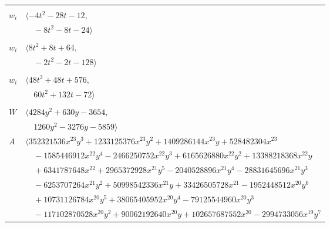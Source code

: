 \documentclass[11pt]{article}
\begin{document}
\begin{longtable}{@{}ll@{}}
\addlinespace[2pt]
\multicolumn{2}{@{}p{0.97\textwidth}@{}}{$i=7$, $D_i=4$, $\rho_{ij}$: $15{:}2, \allowbreak 21{:}1, \allowbreak 36{:}1, \allowbreak 42{:}1, \allowbreak 45{:}1, \allowbreak 56{:}2, \allowbreak 63{:}2, \allowbreak 64{:}1, \allowbreak 73{:}2$}\\
$w_i$ & $\langle -4t^{2}-28t-12,$\\
 & $\quad -8t^{2}-8t-24\rangle$\\
\addlinespace[2pt]
\multicolumn{2}{@{}p{0.97\textwidth}@{}}{$i=8$, $D_i=2$, $\rho_{ij}$: $1{:}2, \allowbreak 14{:}2, \allowbreak 32{:}2, \allowbreak 45{:}1, \allowbreak 50{:}2, \allowbreak 65{:}1$}\\
$w_i$ & $\langle 8t^{2}+8t+64,$\\
 & $\quad -2t^{2}-2t-128\rangle$\\
\addlinespace[2pt]
\multicolumn{2}{@{}p{0.97\textwidth}@{}}{$i=9$, $D_i=2$, $\rho_{ij}$: $34{:}2, \allowbreak 36{:}2, \allowbreak 50{:}2, \allowbreak 51{:}1, \allowbreak 56{:}1, \allowbreak 60{:}2, \allowbreak 63{:}2$}\\
$w_i$ & $\langle 48t^{2}+48t+576,$\\
 & $\quad 60t^{2}+132t-72\rangle$\\
\addlinespace[2pt]
\multicolumn{2}{@{}p{0.97\textwidth}@{}}{$i=10$, $D_i=128$, $\rho_{ij}$: $1{:}2, \allowbreak 13{:}2, \allowbreak 14{:}2, \allowbreak 16{:}1, \allowbreak 17{:}1, \allowbreak 18{:}1, \allowbreak 21{:}1, \allowbreak 25{:}2, \allowbreak 40{:}2, \allowbreak 47{:}1, \allowbreak 53{:}1, \allowbreak 57{:}1, \allowbreak 59{:}2, \allowbreak 60{:}2, \allowbreak 63{:}2, \allowbreak 64{:}1, \allowbreak 66{:}2, \allowbreak 73{:}1$}\\
$W$ & $\langle 4284y^{2}+630y-3654,$\\
 & $\quad 1260y^{2}-3276y-5859\rangle$\\
$A$ & $\langle 352321536x^{23}y^{3}+1233125376x^{23}y^{2}+1409286144x^{23}y+528482304x^{23}$\\
 & $\quad -1585446912x^{22}y^{4}-2466250752x^{22}y^{3}+6165626880x^{22}y^{2}+13388218368x^{22}y$\\
 & $\quad +6341787648x^{22}+2965372928x^{21}y^{5}-2040528896x^{21}y^{4}-28831645696x^{21}y^{3}$\\
 & $\quad -6253707264x^{21}y^{2}+50998542336x^{21}y+33426505728x^{21}-1952448512x^{20}y^{6}$\\
 & $\quad +10731126784x^{20}y^{5}+38065405952x^{20}y^{4}-79125544960x^{20}y^{3}$\\
 & $\quad -117102870528x^{20}y^{2}+90062192640x^{20}y+102657687552x^{20}-2994733056x^{19}y^{7}$\\

\end{longtable}
\end{document}
